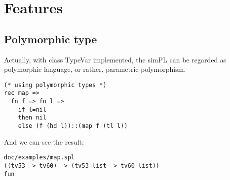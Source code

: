 \documentclass[paper=a4, fontsize=11pt]{scrartcl}
\begin{document}
\section{Features}
\subsection{Polymorphic type}
Actually, with class TypeVar implemented, the simPL can be regarded as polymorphic language, or rather, parametric polymorphism.
\begin{lstlisting}[title=map.spl, frame=shadowbox]
(* using polymorphic types *)
rec map =>
  fn f => fn l =>
    if l=nil
    then nil
    else (f (hd l))::(map f (tl l))
\end{lstlisting}
And we can see the result:
\begin{lstlisting}[title=Result, frame=shadowbox]
doc/examples/map.spl
((tv53 -> tv60) -> (tv53 list -> tv60 list))
fun
\end{lstlisting}
\end{document}
